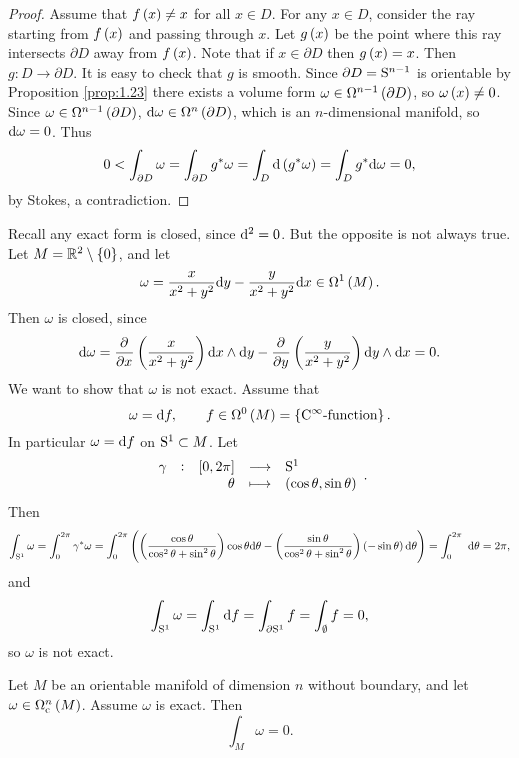 \begin{proof}
Assume that $ f\br{x} \ne x $ for all $ x \in D $. For any $ x \in D $, consider the ray starting from $ f\br{x} $ and passing through $ x $. Let $ g\br{x} $ be the point where this ray intersects $ \partial D $ away from $ f\br{x} $. Note that if $ x \in \partial D $ then $ g\br{x} = x $. Then $ g : D \to \partial D $. It is easy to check that $ g $ is smooth. Since $ \partial D = \S^{n - 1} $ is orientable by Proposition \ref{prop:1.23} there exists a volume form $ \omega \in \Omega^{n - 1}\br{\partial D} $, so $ \omega\br{x} \ne 0 $. Since $ \omega \in \Omega^{n - 1}\br{\partial D} $, $ \d\omega \in \Omega^n\br{\partial D} $, which is an $ n $-dimensional manifold, so $ \d\omega = 0 $. Thus
$$ 0 < \int_{\partial D} \omega = \int_{\partial D} g^*\omega = \int_D \d\br{g^*\omega} = \int_D g^*\d\omega = 0, $$
by Stokes, a contradiction.
\end{proof}

\begin{example}
Recall any exact form is closed, since $ \d^2 = 0 $. But the opposite is not always true. Let $ M = \RR^2 \setminus \cbr{0} $, and let
$$ \omega = \dfrac{x}{x^2 + y^2}\d y - \dfrac{y}{x^2 + y^2}\d x \in \Omega^1\br{M}. $$
Then $ \omega $ is closed, since
$$ \d\omega = \dpd{}{x}\br{\dfrac{x}{x^2 + y^2}}\d x \wedge \d y - \dpd{}{y}\br{\dfrac{y}{x^2 + y^2}}\d y \wedge \d x = 0. $$
We want to show that $ \omega $ is not exact. Assume that
$$ \omega = \d f, \qquad f \in \Omega^0\br{M} = \cbr{\text{$ \C^\infty $-function}}. $$
In particular $ \omega = \d f $ on $ \S^1 \subset M $. Let
$$ \function[\gamma]{\sbr{0, 2\pi}}{\S^1}{\theta}{\br{\cos \theta, \sin \theta}}. $$
Then
$$ \int_{\S^1} \omega = \int_0^{2\pi} \gamma^*\omega = \int_0^{2\pi} \br{\br{\dfrac{\cos \theta}{\cos^2 \theta + \sin^2 \theta}}\cos \theta\d\theta - \br{\dfrac{\sin \theta}{\cos^2 \theta + \sin^2 \theta}}\br{-\sin \theta}\d\theta} = \intd{0}{2\pi}{}{\theta} = 2\pi, $$
and
$$ \int_{\S^1} \omega = \int_{\S^1} \d f = \int_{\partial\S^1} f = \int_\emptyset f = 0, $$
so $ \omega $ is not exact.
\end{example}

\pagebreak

\begin{proposition}
Let $ M $ be an orientable manifold of dimension $ n $ without boundary, and let $ \omega \in \Omega_\c^n\br{M} $. Assume $ \omega $ is exact. Then
$$ \int_M \omega = 0. $$
\end{proposition}

